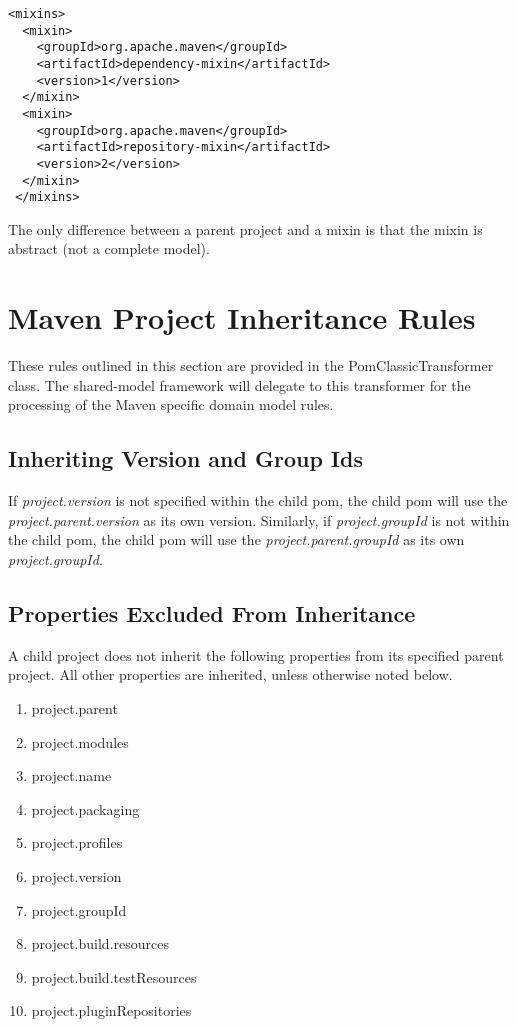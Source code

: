 \documentclass[12pt]{amsart}
\begin{document}
\begin{verbatim}
<mixins>
  <mixin>
    <groupId>org.apache.maven</groupId>
    <artifactId>dependency-mixin</artifactId>
    <version>1</version>
  </mixin>
  <mixin>
    <groupId>org.apache.maven</groupId>
    <artifactId>repository-mixin</artifactId>
    <version>2</version>
  </mixin>
 </mixins>
\end{verbatim}

The only difference between a parent project and a mixin is that the mixin is abstract (not a complete model).

\section{Maven Project Inheritance Rules}
These rules outlined in this section are provided in the PomClassicTransformer class. The shared-model framework will delegate to this transformer for the processing of the Maven specific domain model rules.

\subsection{Inheriting Version and Group Ids}
If \emph{project.version} is not specified within the child pom, the child pom will use the \emph{project.parent.version} as its own version. Similarly, if \emph{project.groupId} is not within the child pom, the child pom will use the \emph{project.parent.groupId} as its own \emph{project.groupId}.

\subsection{Properties Excluded From Inheritance}
A child project does not inherit the following properties from its specified parent project. All other properties are inherited, unless otherwise noted below.
\begin{enumerate}
\item project.parent
\item project.modules
\item project.name
\item project.packaging
\item project.profiles
\item project.version
\item project.groupId
\item project.build.resources
\item project.build.testResources
\item project.pluginRepositories
\end{enumerate}
\end{document}
